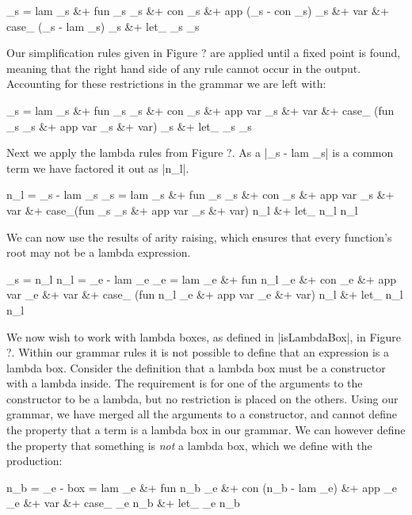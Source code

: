 \documentclass[preprint]{sigplanconf}
\begin{document}
\begin{code}
_s  =  lam _s &+ fun _s _s &+ con _s &+ app (_s - con _s) _s &+ var &+
       case_ (_s - lam _s) _s &+ let_ _s _s
\end{code}

Our simplification rules given in Figure ? are applied until a fixed point is found, meaning that the right hand side of any rule cannot occur in the output. Accounting for these restrictions in the grammar we are left with:

\begin{code}
_s  =  lam _s &+ fun _s _s &+ con _s &+ app var _s &+ var &+
       case_ (fun _s _s &+ app var _s &+ var) _s &+ let_ _s _s
\end{code}

Next we apply the lambda rules from Figure ?. As a |_s - lam _s| is a common term we have factored it out as |n_l|.

\begin{code}
n_l  =  _s - lam _s
_s   =  lam _s &+ fun _s _s &+ con _s &+ app var _s &+ var &+
        case_(fun _s _s &+ app var _s &+ var) n_l &+ let_ n_l n_l
\end{code}

We can now use the results of arity raising, which ensures that every function's root may not be a lambda expression.

\begin{code}
_s   = n_l
n_l = _e - lam _e
_e =  lam _e &+ fun n_l _e &+ con _e &+ app var _e &+ var &+
      case_ (fun n_l _e &+ app var _e &+ var) n_l &+ let_ n_l n_l
\end{code}

We now wish to work with lambda boxes, as defined in |isLambdaBox|, in Figure ?. Within our grammar rules it is not possible to define that an expression is a lambda box. Consider the definition that a lambda box must be a constructor with a lambda inside. The requirement is for one of the arguments to the constructor to be a lambda, but no restriction is placed on the others. Using our grammar, we have merged all the arguments to a constructor, and cannot define the property that a term is a lambda box in our grammar. We can however define the property that something is \textit{not} a lambda box, which we define with the production:

% 
\begin{code}
n_b  =  _e - box
     =  lam _e &+ fun n_b _e &+ con (n_b - lam _e) &+ app _e _e &+ var &+
        case_ _e n_b &+ let_ _e n_b
\end{code}
\end{document}
